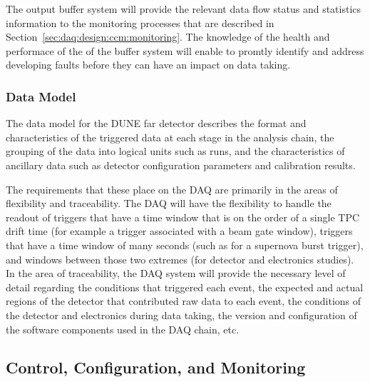 The output buffer system will provide the relevant data flow status and statistics information to the monitoring processes that are described in Section~\ref{sec:daq:design:ccm:monitoring}. The knowledge of the health and performace of the of the buffer system will enable to promtly identify and address developing faults before they can have an impact on data taking.

\subsubsection{Data Model}
\label{sec:fd-daq:design-data-model}


The data model for the DUNE far detector describes the format and characteristics of the triggered data at each stage in the analysis chain, the grouping of the data into logical units such as runs, and the characteristics of ancillary data such as detector configuration parameters and calibration results.

The requirements that these place on the DAQ are primarily in the areas of flexibility and traceability.  The DAQ will have the flexibility to handle the readout of triggers that have a time window that is on the order of a single TPC drift time (for example a trigger associated with a beam gate window), triggers that have a time window of many seconds (such as for a supernova burst trigger), and windows between those two extremes (for detector and electronics studies).  In the area of traceability, the DAQ system will provide the necessary level of detail regarding the conditions that triggered each event, the expected and actual regions of the detector that contributed raw data to each event, the conditions of the detector and electronics during data taking, the version and configuration of the software components used in the DAQ chain, etc.

\subsection{Control, Configuration, and Monitoring}
\label{sec:fd-daq:design-run-control}

